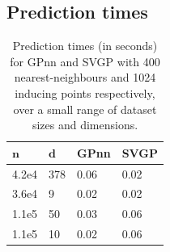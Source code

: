 \subsection{Prediction times}
 \begin{table}[h]
    \centering
    \caption{Prediction times (in seconds) for GPnn and SVGP with 400 nearest-neighbours and 1024 inducing points respectively, over a small range of dataset sizes and dimensions.}
    \begin{tabular}{llll}
    \hline
    {\(\bm{n}\)} & {\(\bm{d}\)} & \textbf{GPnn} & \textbf{SVGP}\\
       \hline
       4.2e4 & 378 & 0.06   & 0.02  \\
       3.6e4 & 9   & 0.02   & 0.02  \\
       1.1e5 & 50  & 0.03   & 0.06  \\
       1.1e5 & 10  & 0.02   & 0.06  \\
        \hline
    \end{tabular}
    \label{tab:pred_times}
\end{table} 